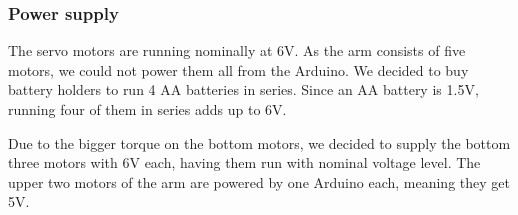 \documentclass[11pt,a4paper]{report}
\begin{document}
	\subsubsection{Power supply}
	The servo motors are running nominally at 6V. As the arm consists of five motors, we could not power them all from the Arduino. We decided to buy battery holders to run 4 AA batteries in series. Since an AA battery is 1.5V, running four of them in series adds up to 6V.
	
	Due to the bigger torque on the bottom motors, we decided to supply the bottom three motors with 6V each,  having them run with nominal voltage level. The upper two motors of the arm are powered by one Arduino each, meaning they get 5V.
	
	
	
	
	
	
	
\end{document}
